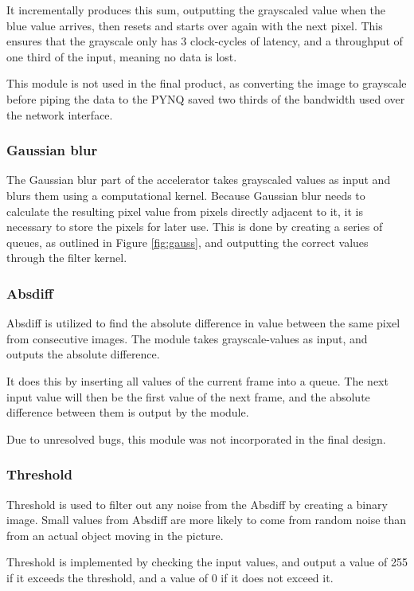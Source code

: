 It incrementally produces this sum, outputting the grayscaled value when the blue value arrives, then resets and starts over again with the next pixel. This ensures that the grayscale only has 3 clock-cycles of latency, and a throughput of one third of the input, meaning no data is lost.

This module is not used in the final product, as converting the image to grayscale before piping the data to the PYNQ saved two thirds of the bandwidth used over the network interface.

\subsubsection{Gaussian blur}
The Gaussian blur part of the accelerator takes grayscaled values as input and blurs them using a computational kernel. Because Gaussian blur needs to calculate the resulting pixel value from pixels directly adjacent to it, it is necessary to store the pixels for later use. This is done by creating a series of queues, as outlined in Figure \ref{fig:gauss}, and outputting the correct values through the filter kernel.

\subsubsection{Absdiff}
Absdiff is utilized to find the absolute difference in value between the same pixel from consecutive images. The module takes grayscale-values as input, and outputs the absolute difference.

It does this by inserting all values of the current frame into a queue. The next input value will then be the first value of the next frame, and the absolute difference between them is output by the module.

Due to unresolved bugs, this module was not incorporated in the final design.

\subsubsection{Threshold}
Threshold is used to filter out any noise from the Absdiff by creating a binary image. Small values from Absdiff are more likely to come from random noise than from an actual object moving in the picture.

Threshold is implemented by checking the input values, and output a value of 255 if it exceeds the threshold, and a value of 0 if it does not exceed it.

